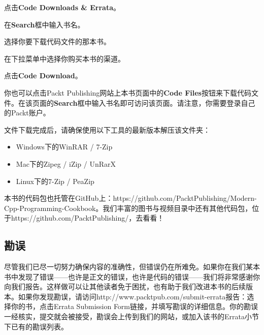 
点击\textbf{Code Downloads \& Errata}。



在\textbf{Search}框中输入书名。



选择你要下载代码文件的那本书。



在下拉菜单中选择你购买本书的渠道。



点击\textbf{Code Download}。



你也可以点击Packt Publishing网站上本书页面中的\textbf{Code Files}按钮来下载代码文件。在该页面的\textbf{Search}框中输入书名即可访问该页面。请注意，你需要登录自己的Packt账户。



文件下载完成后，请确保使用以下工具的最新版本解压该文件夹：



\begin{itemize}
\item Windows下的WinRAR / 7-Zip



\item Mac下的Zipeg / iZip / UnRarX



\item Linux下的7-Zip / PeaZip

\end{itemize}



本书的代码包也托管在GitHub上：https://\allowbreak{}github.\allowbreak{}com/\allowbreak{}PacktPublishing/\allowbreak{}Modern-\allowbreak{}Cpp-\allowbreak{}Programming-\allowbreak{}Cookbook。我们丰富的图书与视频目录中还有其他代码包，位于https://\allowbreak{}github.\allowbreak{}com/\allowbreak{}PacktPublishing/\allowbreak{}，去看看！



\subsection*{勘误}



尽管我们已尽一切努力确保内容的准确性，但错误仍在所难免。如果你在我们某本书中发现了错误——也许是正文的错误，也许是代码的错误——我们将非常感谢你向我们报告。这样做可以让其他读者免于困扰，也有助于我们改进本书的后续版本。如果你发现勘误，请访问http://\allowbreak{}www.\allowbreak{}packtpub.\allowbreak{}com/\allowbreak{}submit-\allowbreak{}errata报告：选择你的书，点击Errata Submission Form链接，并填写勘误的详细信息。你的勘误一经核实，提交就会被接受，勘误会上传到我们的网站，或加入该书的Errata小节下已有的勘误列表。


